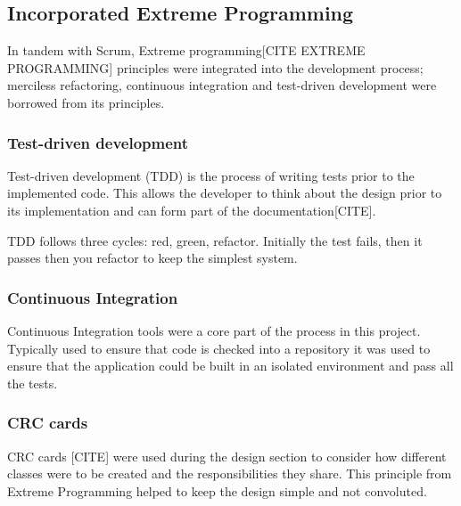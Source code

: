 \subsection{Incorporated Extreme Programming}
In tandem with Scrum, Extreme programming[CITE EXTREME PROGRAMMING] principles were integrated into the development process; merciless refactoring, continuous integration and test-driven development were borrowed from its principles.

\subsubsection{Test-driven development}
Test-driven development (TDD) is the process of writing tests prior to the implemented code. This allows the developer to think about the design prior to its implementation and can form part of the documentation[CITE].

TDD follows three cycles: red, green, refactor. Initially the test fails, then it passes then you refactor to keep the simplest system.

\subsubsection{Continuous Integration}
Continuous Integration tools were a core part of the process in this project. Typically used to ensure that code is checked into a repository it was used to ensure that the application could be built in an isolated environment and pass all the tests.

\subsubsection{CRC cards}
CRC cards [CITE] were used during the design section to consider how different classes were to be created and the responsibilities they share. This principle from Extreme Programming helped to keep the design simple and not convoluted.
